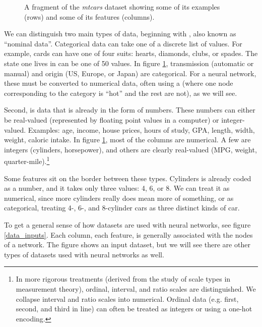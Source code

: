 \begin{figure}[h]
\centering
{}
\caption[Jeff Yoshimi, based on the Motor Trend Car Road Tests dataset included with R.]{A fragment of the \emph{mtcars} dataset showing some of its examples (rows) and some of its features (columns).}
\label{cars_dataset}
\end{figure}

We can distinguish two main types of data, beginning with , also known as ``nominal data''. Categorical data can take one of a discrete list of values. For example, cards can have one of four suits: hearts, diamonds, clubs, or spades. The state one lives in can be one of 50 values. In figure \ref{cars_dataset}, transmission (automatic or manual) and origin (US, Europe, or Japan) are categorical. For a neural network, these must be converted to numerical data, often using a  (where one node corresponding to the category is ``hot'' and the rest are not), as we will see.

Second,  is data that is already in the form of numbers. These numbers can either be real-valued (represented by floating point values in a computer) or integer-valued. Examples: age, income, house prices, hours of study, GPA, length, width, weight, caloric intake. In figure \ref{cars_dataset}, most of the columns are numerical. A few are integers (cylinders, horsepower), and others are clearly real-valued (MPG, weight, quarter-mile).\footnote{In more rigorous treatments (derived from the study of scale types in measurement theory), ordinal, interval, and ratio scales are distinguished. We collapse interval and ratio scales into numerical. Ordinal data (e.g. first, second, and third in line) can often be treated as integers or using a one-hot encoding.}

Some features sit on the border between these types. Cylinders is already coded as a number, and it takes only three values: 4, 6, or 8. We can treat it as numerical, since more cylinders really does mean more of something, or as categorical, treating 4-, 6-, and 8-cylinder cars as three distinct kinds of car. 

To get a general sense of how datasets are used with neural networks, see figure \ref{data_inputs}. Each column, each feature, is generally associated with the nodes of a network. The figure shows an input dataset, but we will see there are other types of datasets used with neural networks as well.

